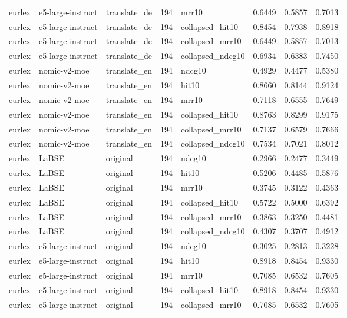 \begin{tabular}{lllrlrrr}
eurlex & e5-large-instruct & translate\_de & 194 & mrr10 & 0.6449 & 0.5857 & 0.7013 \\
eurlex & e5-large-instruct & translate\_de & 194 & collapsed\_hit10 & 0.8454 & 0.7938 & 0.8918 \\
eurlex & e5-large-instruct & translate\_de & 194 & collapsed\_mrr10 & 0.6449 & 0.5857 & 0.7013 \\
eurlex & e5-large-instruct & translate\_de & 194 & collapsed\_ndcg10 & 0.6934 & 0.6383 & 0.7450 \\
eurlex & nomic-v2-moe & translate\_en & 194 & ndcg10 & 0.4929 & 0.4477 & 0.5380 \\
eurlex & nomic-v2-moe & translate\_en & 194 & hit10 & 0.8660 & 0.8144 & 0.9124 \\
eurlex & nomic-v2-moe & translate\_en & 194 & mrr10 & 0.7118 & 0.6555 & 0.7649 \\
eurlex & nomic-v2-moe & translate\_en & 194 & collapsed\_hit10 & 0.8763 & 0.8299 & 0.9175 \\
eurlex & nomic-v2-moe & translate\_en & 194 & collapsed\_mrr10 & 0.7137 & 0.6579 & 0.7666 \\
eurlex & nomic-v2-moe & translate\_en & 194 & collapsed\_ndcg10 & 0.7534 & 0.7021 & 0.8012 \\
eurlex & LaBSE & original & 194 & ndcg10 & 0.2966 & 0.2477 & 0.3449 \\
eurlex & LaBSE & original & 194 & hit10 & 0.5206 & 0.4485 & 0.5876 \\
eurlex & LaBSE & original & 194 & mrr10 & 0.3745 & 0.3122 & 0.4363 \\
eurlex & LaBSE & original & 194 & collapsed\_hit10 & 0.5722 & 0.5000 & 0.6392 \\
eurlex & LaBSE & original & 194 & collapsed\_mrr10 & 0.3863 & 0.3250 & 0.4481 \\
eurlex & LaBSE & original & 194 & collapsed\_ndcg10 & 0.4307 & 0.3707 & 0.4912 \\
eurlex & e5-large-instruct & original & 194 & ndcg10 & 0.3025 & 0.2813 & 0.3228 \\
eurlex & e5-large-instruct & original & 194 & hit10 & 0.8918 & 0.8454 & 0.9330 \\
eurlex & e5-large-instruct & original & 194 & mrr10 & 0.7085 & 0.6532 & 0.7605 \\
eurlex & e5-large-instruct & original & 194 & collapsed\_hit10 & 0.8918 & 0.8454 & 0.9330 \\
eurlex & e5-large-instruct & original & 194 & collapsed\_mrr10 & 0.7085 & 0.6532 & 0.7605 \\

\end{tabular}
